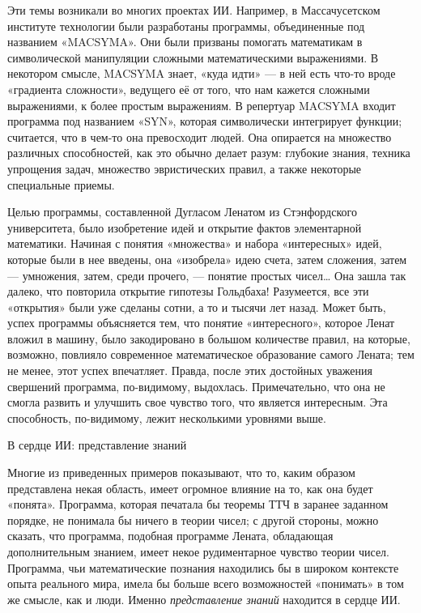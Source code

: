 \documentclass[../main.tex]{subfiles}
\begin{document}
Эти темы возникали во многих проектах ИИ\@. Например, в Массачусетском институте технологии были разработаны программы, объединенные под названием «MACSYMA». Они были призваны помогать математикам в символической манипуляции сложными математическими выражениями. В некотором смысле, MACSYMA знает, «куда идти» --- в ней есть что-то вроде «градиента сложности», ведущего её от того, что нам кажется сложными выражениями, к более простым выражениям. В репертуар MACSYMA входит программа под названием «SYN», которая символически интегрирует функции; считается, что в чем-то она превосходит людей. Она опирается на множество различных способностей, как это обычно делает разум: глубокие знания, техника упрощения задач, множество эвристических правил, а также некоторые специальные приемы.

Целью программы, составленной Дугласом Ленатом из Стэнфордского университета, было изобретение идей и открытие фактов элементарной математики. Начиная с понятия «множества» и набора «интересных» идей, которые были в нее введены, она «изобрела» идею счета, затем сложения, затем --- умножения, затем, среди прочего, --- понятие простых чисел\ldots{} Она зашла так далеко, что повторила открытие гипотезы Гольдбаха! Разумеется, все эти «открытия» были уже сделаны сотни, а то и тысячи лет назад. Может быть, успех программы объясняется тем, что понятие «интересного», которое Ленат вложил в машину, было закодировано в большом количестве правил, на которые, возможно, повлияло современное математическое образование самого Лената; тем не менее, этот успех впечатляет. Правда, после этих достойных уважения свершений программа, по-видимому, выдохлась. Примечательно, что она не смогла развить и улучшить свое чувство того, что является интересным. Эта способность, по-видимому, лежит несколькими уровнями выше.

В сердце ИИ: представление знаний

Многие из приведенных примеров показывают, что то, каким образом представлена некая область, имеет огромное влияние на то, как она будет «понята». Программа, которая печатала бы теоремы ТТЧ в заранее заданном порядке, не понимала бы ничего в теории чисел; с другой стороны, можно сказать, что программа, подобная программе Лената, обладающая дополнительным знанием, имеет некое рудиментарное чувство теории чисел. Программа, чьи математические познания находились бы в широком контексте опыта реального мира, имела бы больше всего возможностей «понимать» в том же смысле, как и люди. Именно \emph{представление знаний} находится в сердце ИИ.
\end{document}
